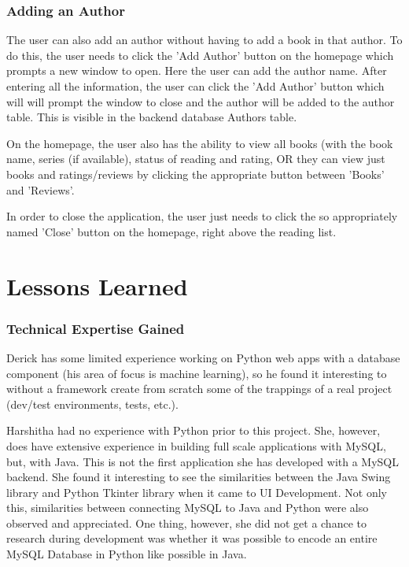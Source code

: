 \documentclass{article}
\begin{document}
\subsubsection*{Adding an Author}

The user can also add an author without having to add a book in that author. To
do this, the user needs to click the 'Add Author' button on the homepage which
prompts a new window to open. Here the user can add the author name. After
entering all the information, the user can click the 'Add Author' button which
will will prompt the window to close and the author will be added to the author
table. This is visible in the backend database Authors table.

On the homepage, the user also has the ability to view all books (with the book
name, series (if available), status of reading and rating, OR they can view just
books and ratings/reviews by clicking the appropriate button between 'Books' and
'Reviews'.

In order to close the application, the user just needs to click the so
appropriately named 'Close' button on the homepage, right above the reading
list.

\section*{Lessons Learned}

\subsubsection*{Technical Expertise Gained}

Derick has some limited experience
working on Python web apps with a database component
(his area of focus is machine learning),
so he found it interesting to without a framework create from scratch
some of the trappings of a real project
(dev/test environments, tests, etc.).

Harshitha had no experience with Python prior to this project. She, however,
does have extensive experience in building full scale applications with MySQL,
but, with Java. This is not the first application she has developed with a MySQL
backend. She found it interesting to see the similarities between the Java Swing
library and Python Tkinter library when it came to UI Development. Not only
this, similarities between connecting MySQL to Java and Python were also
observed and appreciated. One thing, however, she did not get a chance to
research during development was whether it was possible to encode an entire
MySQL Database in Python like possible in Java.
\end{document}
